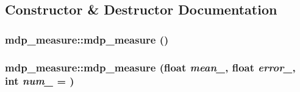\subsection{Constructor \& Destructor Documentation}
\hypertarget{classmdp__measure_a27caa03e148574a5e3e13b587212bc6a}{
\subsubsection[{mdp\_\-measure}]{\setlength{\rightskip}{0pt plus 5cm}mdp\_\-measure::mdp\_\-measure ()}}
\label{classmdp__measure_a27caa03e148574a5e3e13b587212bc6a}
\hypertarget{classmdp__measure_a861159da4e045611fa06b937c63d91ab}{
\subsubsection[{mdp\_\-measure}]{\setlength{\rightskip}{0pt plus 5cm}mdp\_\-measure::mdp\_\-measure (float {\em mean\_\-}, \/  float {\em error\_\-}, \/  int {\em num\_\-} = {})}}
\label{classmdp__measure_a861159da4e045611fa06b937c63d91ab}


